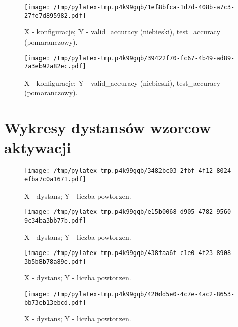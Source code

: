 \documentclass{article}%
\begin{document}
%
\newpage%


\begin{figure}[h]%
\centering%
\texttt{[image: /tmp/pylatex-tmp.p4k99gqb/1ef8bfca-1d7d-408b-a7c3-27fe7d895982.pdf]}%
\caption{X {-} konfiguracje; Y {-} valid\_accuracy (niebieski), test\_accuracy (pomaranczowy).}%
\end{figure}

%
\newpage%


\begin{figure}[h]%
\centering%
\texttt{[image: /tmp/pylatex-tmp.p4k99gqb/39422f70-fc67-4b49-ad89-7a3eb92a82ec.pdf]}%
\caption{X {-} konfiguracje; Y {-} valid\_accuracy (niebieski), test\_accuracy (pomaranczowy).}%
\end{figure}

%
\newpage

%
\section{Wykresy dystansów wzorcow aktywacji}%
\label{sec:Wykresydystanswwzorcowaktywacji}%


\begin{figure}[h]%
\centering%
\texttt{[image: /tmp/pylatex-tmp.p4k99gqb/3482bc03-2fbf-4f12-8024-efba7c0a1671.pdf]}%
\caption{X {-} dystans; Y {-} liczba powtorzen.}%
\end{figure}

%
\newpage%


\begin{figure}[h]%
\centering%
\texttt{[image: /tmp/pylatex-tmp.p4k99gqb/e15b0068-d905-4782-9560-9c34ba3bb77b.pdf]}%
\caption{X {-} dystans; Y {-} liczba powtorzen.}%
\end{figure}

%
\newpage%


\begin{figure}[h]%
\centering%
\texttt{[image: /tmp/pylatex-tmp.p4k99gqb/438faa6f-c1e0-4f23-8908-3b5b8b78a89e.pdf]}%
\caption{X {-} dystans; Y {-} liczba powtorzen.}%
\end{figure}

%
\newpage%


\begin{figure}[h]%
\centering%
\texttt{[image: /tmp/pylatex-tmp.p4k99gqb/420dd5e0-4c7e-4ac2-8653-bb73eb13ebcd.pdf]}%
\caption{X {-} dystans; Y {-} liczba powtorzen.}%
\end{figure}
\end{document}
